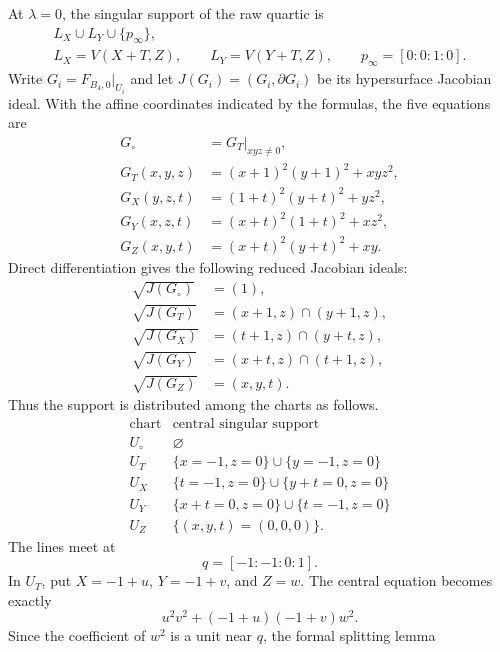 \documentclass[11pt]{amsart}
\theoremstyle{definition}
\theoremstyle{remark}
\begin{document}
At $\lambda=0$, the singular support of the raw quartic is
\begin{equation}
\label{eq:B4_raw_support}
\begin{gathered}
L_X\cup L_Y\cup\{p_\infty\},\\
L_X=V(X+T,Z),\qquad L_Y=V(Y+T,Z),\qquad
p_\infty=[0:0:1:0].
\end{gathered}
\end{equation}
Write $G_i=F_{B_4,0}|_{U_i}$ and let
$J(G_i)=(G_i,\partial G_i)$ be its hypersurface Jacobian ideal.  With the
affine coordinates indicated by the formulas, the five equations are
\begin{align*}
G_\circ&=G_T|_{xyz\neq0},\\
G_T(x,y,z)&=(x+1)^2(y+1)^2+xyz^2,\\
G_X(y,z,t)&=(1+t)^2(y+t)^2+yz^2,\\
G_Y(x,z,t)&=(x+t)^2(1+t)^2+xz^2,\\
G_Z(x,y,t)&=(x+t)^2(y+t)^2+xy.
\end{align*}
Direct differentiation gives the following reduced Jacobian ideals:
\begin{align}
\sqrt{J(G_\circ)}&=(1),
\label{eq:B4_jacobian_torus}\\
\sqrt{J(G_T)}
&=(x+1,z)\cap(y+1,z),
\label{eq:B4_jacobian_T}\\
\sqrt{J(G_X)}
&=(t+1,z)\cap(y+t,z),
\label{eq:B4_jacobian_X}\\
\sqrt{J(G_Y)}
&=(x+t,z)\cap(t+1,z),
\label{eq:B4_jacobian_Y}\\
\sqrt{J(G_Z)}&=(x,y,t).
\label{eq:B4_jacobian_Z}
\end{align}
Thus the support is distributed among the charts as follows.
\[
\begin{array}{c|c}
\text{chart}&\text{central singular support}\\ \hline
U_\circ&\varnothing\\
U_T&\{x=-1,z=0\}\cup\{y=-1,z=0\}\\
U_X&\{t=-1,z=0\}\cup\{y+t=0,z=0\}\\
U_Y&\{x+t=0,z=0\}\cup\{t=-1,z=0\}\\
U_Z&\{(x,y,t)=(0,0,0)\}.
\end{array}
\]
The lines meet at
\[
q=[-1:-1:0:1].
\]
In $U_T$, put $X=-1+u$, $Y=-1+v$, and $Z=w$.  The central equation becomes
exactly
\begin{equation}
\label{eq:B4_crossing}
u^2v^2+(-1+u)(-1+v)w^2.
\end{equation}
Since the coefficient of $w^2$ is a unit near $q$, the formal splitting lemma
\end{document}
